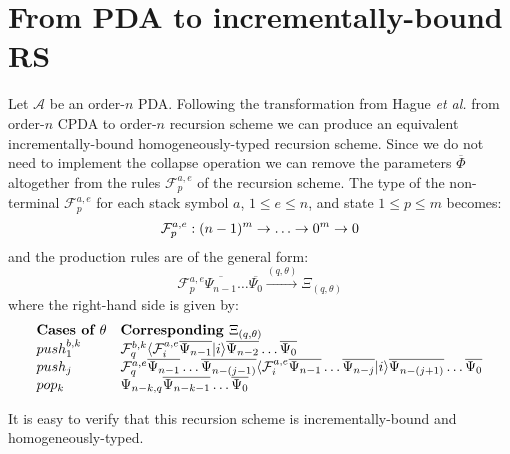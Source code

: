 \documentclass[a4paper,draft]{article}
\theoremstyle{remark}
\theoremstyle{definition}
\begin{document}
\section{From PDA to incrementally-bound RS}
Let $\mathcal{A}$ be an order-$n$ PDA. Following the transformation from Hague \emph{et al.} from order-$n$ CPDA to order-$n$ recursion scheme \cite{hmos-lics08} we can produce an equivalent incrementally-bound homogeneously-typed recursion scheme.  Since we do not need to implement the collapse operation we can remove the parameters $\overline\Phi$ altogether from the rules $\mathcal{F}_p^{a,e}$ of the recursion scheme.
The type of the non-terminal $\mathcal{F}_p^{a,e}$  for each stack symbol $a$, $1\leq e \leq n$, and state $1\leq p \leq m$
 becomes:
 $$ \mathcal{F}_p^{a,e} : (n-1)^m \rightarrow \ldots \rightarrow 0^m \rightarrow 0$$
and the production rules are of the general form:
 $$ \mathcal{F}_p^{a,e} \overline{\Psi_{n-1}} \ldots \overline{\Psi_0} \stackrel{(q,\theta)}\rightarrow \Xi_{(q,\theta)}$$  
 where the right-hand side is given by: 
$$\begin{array}{ll}
\mbox{\bf Cases of $\theta$} & \mbox{\bf Corresponding } \Xi_{(q,\theta)} \\
push_1^{b,k} & \mathcal{F}_q^{b,k} \langle \mathcal{F}_i^{a,e} \overline{\Psi_{n-1}} | i \rangle \overline{\Psi_{n-2}} \ldots
 \overline{\Psi_0} \\
push_j & \mathcal{F}_q^{a,e} \overline{\Psi_{n-1}} \ldots \overline{\Psi_{n-(j-1)}}\langle \mathcal{F}_i^{a,e} \overline{\Psi_{n-1}} \ldots \overline{\Psi_{n-j}} | i \rangle \overline{\Psi_{n-(j+1)}} \ldots
 \overline{\Psi_0} \\
pop_k & \Psi_{n-k,q} \overline{\Psi_{n-k-1}} \ldots \overline{\Psi_{0}}
 \end{array}
 $$
 
It is easy to verify that this recursion scheme is incrementally-bound and homogeneously-typed.



\end{document}
